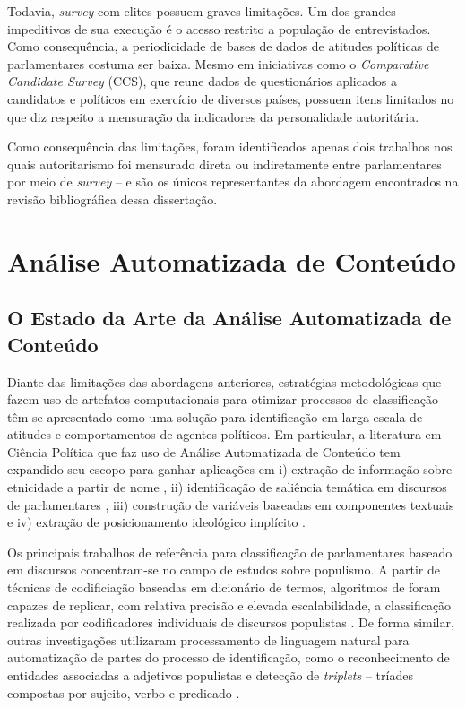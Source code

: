 \documentclass[
12pt,				%
openright,			%
twoside,			%
a4paper,			%
english,			%
french,				%
spanish,			%
brazil				%
]{abntex2}
\begin{document}
Todavia, \emph{survey} com elites possuem graves limitações. Um dos grandes impeditivos de sua execução é o acesso restrito a população de entrevistados. Como consequência, a periodicidade de bases de dados de atitudes políticas de parlamentares costuma ser baixa. Mesmo em iniciativas como o \emph{Comparative Candidate Survey} (CCS), que reune dados de questionários aplicados a candidatos e políticos em exercício de diversos países, possuem itens limitados no que diz respeito a mensuração da indicadores da personalidade autoritária. 

Como consequência das limitações, foram identificados apenas dois trabalhos nos quais autoritarismo foi mensurado direta ou indiretamente entre parlamentares por meio de \emph{survey} --  e  são os únicos representantes da abordagem encontrados na revisão bibliográfica dessa dissertação. 


\section{Análise Automatizada de Conteúdo}

\subsection{O Estado da Arte da Análise Automatizada de Conteúdo}

Diante das limitações das abordagens anteriores, estratégias metodológicas que fazem uso de artefatos computacionais para otimizar processos de classificação têm se apresentado como uma solução para identificação em larga escala de atitudes e comportamentos de agentes políticos. Em particular, a literatura em Ciência Política que faz uso de Análise Automatizada de Conteúdo tem expandido seu escopo para ganhar aplicações em i) extração de informação sobre etnicidade a partir de nome \cite{roberts2016introduction}, ii) identificação de saliência temática em discursos de parlamentares \cite{batista2016mensurando, moreira2016palavra}, iii) construção de variáveis baseadas em componentes textuais \cite{curini2015conditional} e iv) extração de posicionamento ideológico implícito \cite{slapin2008scaling, ceron2016first}.

Os principais trabalhos de referência para classificação de parlamentares baseado em discursos concentram-se no campo de estudos sobre populismo. A partir de técnicas de codificiação baseadas em dicionário de termos, algoritmos de foram capazes de replicar, com relativa precisão e elevada escalabilidade, a classificação realizada por codificadores individuais de discursos populistas \cite{pauwels2011measuring, rooduijn2011measuring, oliver2016rise}. De forma similar, outras investigações utilizaram processamento de linguagem natural para automatização de partes do processo de identificação, como o reconhecimento de entidades associadas a adjetivos populistas \cite{kyle2018populists} e detecção de \emph{triplets} -- tríades compostas por sujeito, verbo e predicado \cite{aslanidis2018measuring}.
\end{document}
